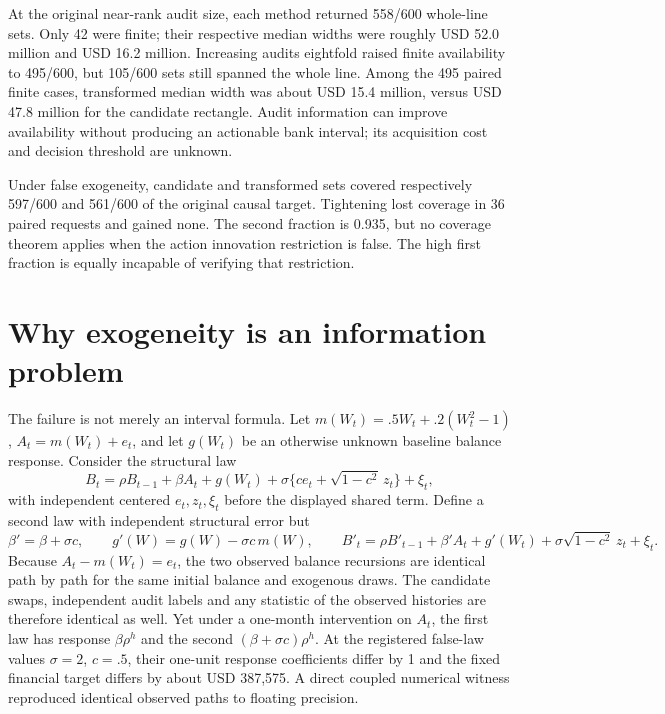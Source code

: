 At the original near-rank audit size, each method returned 558/600 whole-line
sets. Only 42 were finite; their respective median widths were roughly
USD 52.0 million and USD 16.2 million. Increasing audits eightfold raised
finite availability to 495/600, but 105/600 sets still spanned the whole line.
Among the 495 paired finite cases, transformed median width was about
USD 15.4 million, versus USD 47.8 million for the candidate rectangle. Audit
information can improve availability without producing an actionable bank
interval; its acquisition cost and decision threshold are unknown.

Under false exogeneity, candidate and transformed sets covered respectively
597/600 and 561/600 of the original causal target. Tightening lost coverage
in 36 paired requests and gained none. The second fraction is 0.935, but no
coverage theorem applies when the action innovation restriction is false.
The high first fraction is equally incapable of verifying that restriction.

\section{Why exogeneity is an information problem}

The failure is not merely an interval formula. Let
$m(W_t)=.5W_t+.2(W_t^2-1)$, $A_t=m(W_t)+e_t$, and let $g(W_t)$ be an
otherwise unknown baseline balance response. Consider the structural law
\begin{equation}\label{integrated:weak_audit_sharpening:eq:confounded}
 B_t=\rho B_{t-1}+\beta A_t+g(W_t)
      +\sigma\{c e_t+\sqrt{1-c^2}\,z_t\}+\xi_t,
\end{equation}
with independent centered $e_t,z_t,\xi_t$ before the displayed shared term.
Define a second law with independent structural error but
\begin{equation}
 \beta'=\beta+\sigma c,\qquad
 g'(W)=g(W)-\sigma c\,m(W),\qquad
 B'_t=\rho B'_{t-1}+\beta'A_t+g'(W_t)
       +\sigma\sqrt{1-c^2}\,z_t+\xi_t.
\end{equation}
Because $A_t-m(W_t)=e_t$, the two observed balance recursions are
identical path by path for the same initial balance and exogenous draws.
The candidate swaps, independent audit labels and any statistic of the
observed histories are therefore identical as well. Yet under a one-month
intervention on $A_t$, the first law has response $\beta\rho^h$ and the
second $(\beta+\sigma c)\rho^h$. At the registered false-law values
$\sigma=2$, $c=.5$, their one-unit response coefficients differ by 1 and
the fixed financial target differs by about USD 387,575. A direct coupled
numerical witness reproduced identical observed paths to floating precision.

